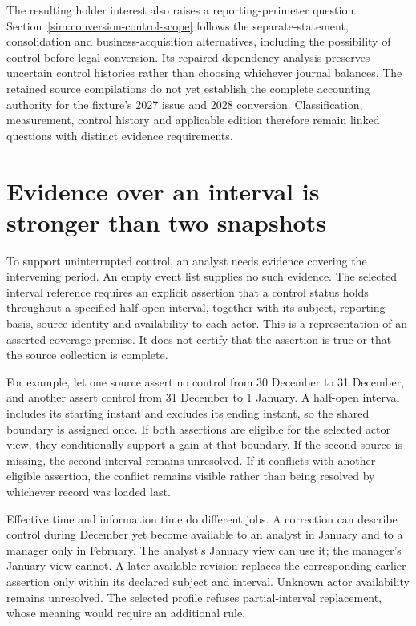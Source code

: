 The resulting holder interest also raises a reporting-perimeter question.
Section~\ref{sim:conversion-control-scope} follows the separate-statement,
consolidation and business-acquisition alternatives, including the possibility
of control before legal conversion. Its repaired dependency analysis preserves
uncertain control histories rather than choosing whichever journal balances.
The retained source compilations do not yet establish the complete accounting
authority for the fixture's 2027 issue and 2028 conversion. Classification,
measurement, control history and applicable edition therefore remain linked
questions with distinct evidence requirements.

\section{Evidence over an interval is stronger than two snapshots}
\label{sim:control-interval-evidence}
To support uninterrupted control, an analyst needs evidence covering the
intervening period. An empty event list supplies no such evidence. The selected
interval reference requires an explicit assertion that a control status holds
throughout a specified half-open interval, together with its subject, reporting
basis, source identity and availability to each actor. This is a representation
of an asserted coverage premise. It does not certify that the assertion is true
or that the source collection is complete.

For example, let one source assert no control from 30 December to 31 December,
and another assert control from 31 December to 1 January. A half-open interval
includes its starting instant and excludes its ending instant, so the shared
boundary is assigned once. If both assertions are eligible for the selected
actor view, they conditionally support a gain at that boundary. If the second
source is missing, the second interval remains unresolved. If it conflicts
with another eligible assertion, the conflict remains visible rather than being
resolved by whichever record was loaded last.

Effective time and information time do different jobs. A correction can describe
control during December yet become available to an analyst in January and to
a manager only in February. The analyst's January view can use it; the manager's
January view cannot. A later available revision replaces the corresponding
earlier assertion only within its declared subject and interval. Unknown actor
availability remains unresolved. The selected profile refuses partial-interval
replacement, whose meaning would require an additional rule.

